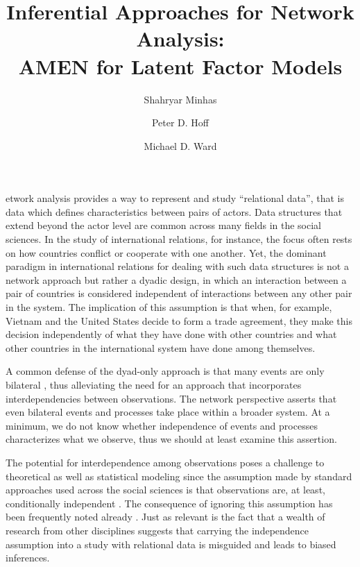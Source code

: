 \documentclass[9pt,twocolumn,twoside,lineno]{pnas-new}
\title{Inferential Approaches for Network Analysis: \\ AMEN for Latent Factor Models}
\author[a,c,1]{Shahryar Minhas}
\author[b,1,2]{Peter D. Hoff}
\author[a]{Michael D. Ward}
\affil[a]{Department of Political Science, Michigan State University, East Lansing, MI 48824, USA}
\affil[b]{Departments of Statistics, Duke University, Durham, NC 27701, USA}
\affil[c]{Department of Political Science, Duke University, Durham, NC 27701, USA}
\begin{document}
\verticaladjustment{-2pt}

\maketitle
\thispagestyle{firststyle}

etwork analysis provides a way to represent and study ``relational data'', that is data which defines characteristics between pairs of actors. Data structures that extend beyond the actor level are common across many fields in the social sciences. In the study of international relations, for instance, the focus often rests on how countries conflict or cooperate with one another. Yet, the dominant paradigm in international relations for dealing with such data structures is not a network approach but rather a dyadic design, in which an interaction between a pair of countries is considered independent of interactions between any other pair in the system. The implication of this assumption is that when, for example, Vietnam and the United States decide to form a trade agreement, they make this decision independently of what they have done with other countries and what other countries in the international system have done among themselves.

A common defense of the dyad-only approach is that many events are only bilateral \citep{diehl:wright:2016}, thus alleviating the need for an approach that incorporates interdependencies between observations. The network perspective asserts that even bilateral events and processes take place within a broader system. At a minimum, we do not know whether independence of events and processes characterizes what we observe, thus we should at least examine this assertion.  

The potential for interdependence among observations poses a challenge to theoretical as well as statistical modeling since the assumption made by standard approaches used across the social sciences is that observations are, at least, conditionally independent \citep{snijders:2011}. The consequence of ignoring this assumption has been frequently noted already \citep{beck:etal:1998,signorino:1999,aronow:etal:2015}. Just as relevant is the fact that a wealth of research from other disciplines suggests that carrying the independence assumption into a study with relational data is misguided and leads to biased inferences.%
\end{document}
